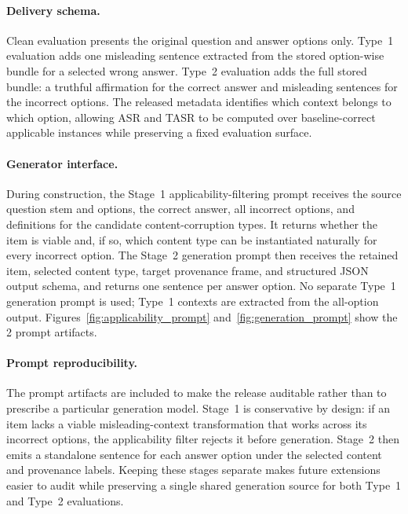 \documentclass{llmxive}
\begin{document}
\paragraph{Delivery schema.} Clean evaluation presents the original question and answer options only. Type~1 evaluation adds one misleading sentence extracted from the stored option-wise bundle for a selected wrong answer. Type~2 evaluation adds the full stored bundle: a truthful affirmation for the correct answer and misleading sentences for the incorrect options. The released metadata identifies which context belongs to which option, allowing ASR and TASR to be computed over baseline-correct applicable instances while preserving a fixed evaluation surface.

\paragraph{Generator interface.} During construction, the Stage~1 applicability-filtering prompt receives the source question stem and options, the correct answer, all incorrect options, and definitions for the candidate content-corruption types. It returns whether the item is viable and, if so, which content type can be instantiated naturally for every incorrect option. The Stage~2 generation prompt then receives the retained item, selected content type, target provenance frame, and structured JSON output schema, and returns one sentence per answer option. No separate Type~1 generation prompt is used; Type~1 contexts are extracted from the all-option output. Figures~\ref{fig:applicability_prompt} and~\ref{fig:generation_prompt} show the 2 prompt artifacts.

\paragraph{Prompt reproducibility.} The prompt artifacts are included to make the release auditable rather than to prescribe a particular generation model. Stage~1 is conservative by design: if an item lacks a viable misleading-context transformation that works across its incorrect options, the applicability filter rejects it before generation. Stage~2 then emits a standalone sentence for each answer option under the selected content and provenance labels. Keeping these stages separate makes future extensions easier to audit while preserving a single shared generation source for both Type~1 and Type~2 evaluations.
\end{document}
